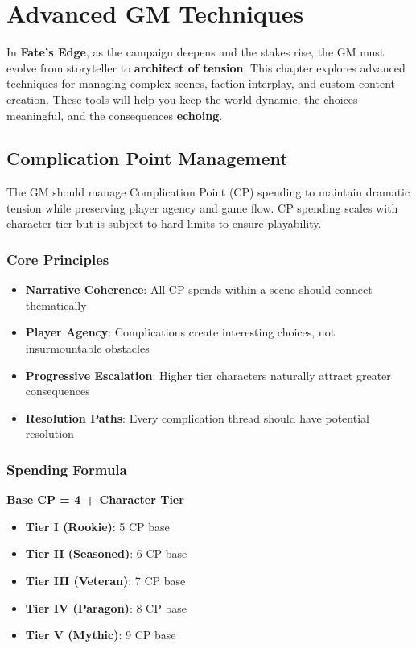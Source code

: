 \chapter{Advanced GM Techniques}

In \textbf{Fate's Edge}, as the campaign deepens and the stakes rise, the GM must evolve from storyteller to \textbf{architect of tension}. This chapter explores advanced techniques for managing complex scenes, faction interplay, and custom content creation. These tools will help you keep the world dynamic, the choices meaningful, and the consequences \textbf{echoing}.

\section{Complication Point Management}

The GM should manage Complication Point (CP) spending to maintain dramatic tension while preserving player agency and game flow. CP spending scales with character tier but is subject to hard limits to ensure playability.

\subsection{Core Principles}
\begin{itemize}
    \item \textbf{Narrative Coherence}: All CP spends within a scene should connect thematically
    \item \textbf{Player Agency}: Complications create interesting choices, not insurmountable obstacles
    \item \textbf{Progressive Escalation}: Higher tier characters naturally attract greater consequences
    \item \textbf{Resolution Paths}: Every complication thread should have potential resolution
\end{itemize}

\subsection{Spending Formula}
\textbf{Base CP = 4 + Character Tier}
\begin{itemize}
    \item \textbf{Tier I (Rookie)}: 5 CP base
    \item \textbf{Tier II (Seasoned)}: 6 CP base
    \item \textbf{Tier III (Veteran)}: 7 CP base
    \item \textbf{Tier IV (Paragon)}: 8 CP base
    \item \textbf{Tier V (Mythic)}: 9 CP base
\end{itemize}

